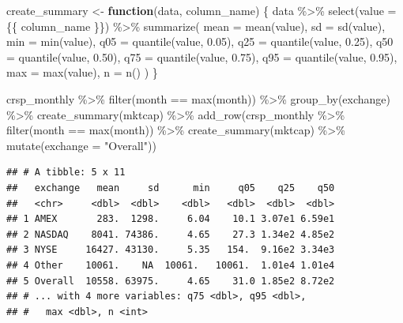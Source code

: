 \documentclass[
]{krantz}
\newenvironment{Shaded}{\begin{snugshade}}{\end{snugshade}}
\newcommand{\AttributeTok}[1]{\textcolor[rgb]{0.61,0.61,0.61}{#1}}
\newcommand{\ControlFlowTok}[1]{\textcolor[rgb]{0.27,0.27,0.27}{\textbf{#1}}}
\newcommand{\FloatTok}[1]{\textcolor[rgb]{0.06,0.06,0.06}{#1}}
\newcommand{\FunctionTok}[1]{\textcolor[rgb]{0,0,0}{#1}}
\newcommand{\NormalTok}[1]{#1}
\newcommand{\OtherTok}[1]{\textcolor[rgb]{0.37,0.37,0.37}{#1}}
\newcommand{\SpecialCharTok}[1]{\textcolor[rgb]{0,0,0}{#1}}
\newcommand{\StringTok}[1]{\textcolor[rgb]{0.5,0.5,0.5}{#1}}
\begin{document}
\begin{Shaded}
\begin{Highlighting}[]
\NormalTok{create\_summary }\OtherTok{\textless{}{-}} \ControlFlowTok{function}\NormalTok{(data, column\_name) \{}
\NormalTok{  data }\SpecialCharTok{\%\textgreater{}\%}
    \FunctionTok{select}\NormalTok{(}\AttributeTok{value =}\NormalTok{ \{\{ column\_name \}\}) }\SpecialCharTok{\%\textgreater{}\%}
    \FunctionTok{summarize}\NormalTok{(}
      \AttributeTok{mean =} \FunctionTok{mean}\NormalTok{(value),}
      \AttributeTok{sd =} \FunctionTok{sd}\NormalTok{(value),}
      \AttributeTok{min =} \FunctionTok{min}\NormalTok{(value),}
      \AttributeTok{q05 =} \FunctionTok{quantile}\NormalTok{(value, }\FloatTok{0.05}\NormalTok{),}
      \AttributeTok{q25 =} \FunctionTok{quantile}\NormalTok{(value, }\FloatTok{0.25}\NormalTok{),}
      \AttributeTok{q50 =} \FunctionTok{quantile}\NormalTok{(value, }\FloatTok{0.50}\NormalTok{),}
      \AttributeTok{q75 =} \FunctionTok{quantile}\NormalTok{(value, }\FloatTok{0.75}\NormalTok{),}
      \AttributeTok{q95 =} \FunctionTok{quantile}\NormalTok{(value, }\FloatTok{0.95}\NormalTok{),}
      \AttributeTok{max =} \FunctionTok{max}\NormalTok{(value),}
      \AttributeTok{n =} \FunctionTok{n}\NormalTok{()}
\NormalTok{    )}
\NormalTok{\}}

\NormalTok{crsp\_monthly }\SpecialCharTok{\%\textgreater{}\%}
  \FunctionTok{filter}\NormalTok{(month }\SpecialCharTok{==} \FunctionTok{max}\NormalTok{(month)) }\SpecialCharTok{\%\textgreater{}\%}
  \FunctionTok{group\_by}\NormalTok{(exchange) }\SpecialCharTok{\%\textgreater{}\%}
  \FunctionTok{create\_summary}\NormalTok{(mktcap) }\SpecialCharTok{\%\textgreater{}\%}
  \FunctionTok{add\_row}\NormalTok{(crsp\_monthly }\SpecialCharTok{\%\textgreater{}\%}
    \FunctionTok{filter}\NormalTok{(month }\SpecialCharTok{==} \FunctionTok{max}\NormalTok{(month)) }\SpecialCharTok{\%\textgreater{}\%}
    \FunctionTok{create\_summary}\NormalTok{(mktcap) }\SpecialCharTok{\%\textgreater{}\%}
    \FunctionTok{mutate}\NormalTok{(}\AttributeTok{exchange =} \StringTok{"Overall"}\NormalTok{))}
\end{Highlighting}
\end{Shaded}

\begin{verbatim}
## # A tibble: 5 x 11
##   exchange   mean     sd      min     q05    q25    q50
##   <chr>     <dbl>  <dbl>    <dbl>   <dbl>  <dbl>  <dbl>
## 1 AMEX       283.  1298.     6.04    10.1 3.07e1 6.59e1
## 2 NASDAQ    8041. 74386.     4.65    27.3 1.34e2 4.85e2
## 3 NYSE     16427. 43130.     5.35   154.  9.16e2 3.34e3
## 4 Other    10061.    NA  10061.   10061.  1.01e4 1.01e4
## 5 Overall  10558. 63975.     4.65    31.0 1.85e2 8.72e2
## # ... with 4 more variables: q75 <dbl>, q95 <dbl>,
## #   max <dbl>, n <int>
\end{verbatim}
\end{document}
